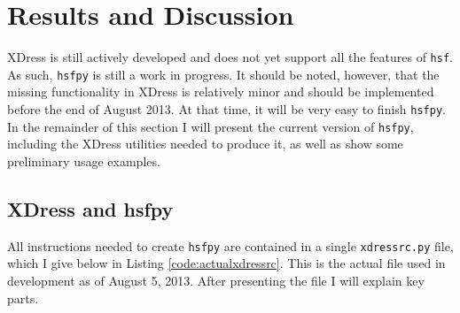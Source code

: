 
\section{Results and Discussion} \label{sec:results_and_discussion}

XDress is still actively developed and does not yet support all the features of \texttt{hsf}. As such, \texttt{hsfpy} is still a work in progress. It should be noted, however, that the missing functionality in XDress is relatively minor and should be implemented before the end of August 2013. At that time, it will be very easy to finish \texttt{hsfpy}. In the remainder of this section I will present the current version of \texttt{hsfpy}, including the XDress utilities needed to produce it, as well as show some preliminary usage examples.

\subsection{XDress and hsfpy} \label{sub:xdress_and_hsfpy}

  All instructions needed to create \texttt{hsfpy} are contained in a single \texttt{xdressrc.py} file, which I give below in Listing \ref{code:actualxdressrc}. This is the actual file used in development as of August 5, 2013. After presenting the file I will explain key parts.
  \vspace{.2in}
  

